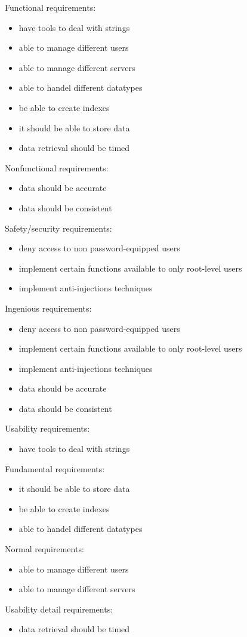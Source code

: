 \begin{elenco}
\item Functional requirements:
\begin{itemize}
    \item have tools to deal with strings
    \item able to manage different users
    \item able to manage different servers
    \item able to handel different datatypes
    \item be able to create indexes
    \item it should be able to store data
    \item data retrieval should be timed
\end{itemize}
\item Nonfunctional requirements:
\begin{itemize}
    \item data should be accurate
    \item data should be consistent
\end{itemize}
\item Safety/security requirements:
\begin{itemize}
	\item deny access to non password-equipped users
	\item implement certain functions available to only root-level users
	\item implement anti-injections techniques
\end{itemize}

Ingenious requirements:
\begin{itemize}
	\item deny access to non password-equipped users
	\item implement certain functions available to only root-level users
	\item implement anti-injections techniques
    \item data should be accurate
    \item data should be consistent
\end{itemize}
 Usability requirements: 
\begin{itemize}
    \item have tools to deal with strings
\end{itemize}
Fundamental requirements:
\begin{itemize}
    \item it should be able to store data
    \item be able to create indexes
    \item able to handel different datatypes
\end{itemize}
Normal requirements:
\begin{itemize}
    \item able to manage different users
    \item able to manage different servers
\end{itemize}
    \item Usability detail requirements:
\begin{itemize}
    \item data retrieval should be timed
\end{itemize}
\end{elenco}